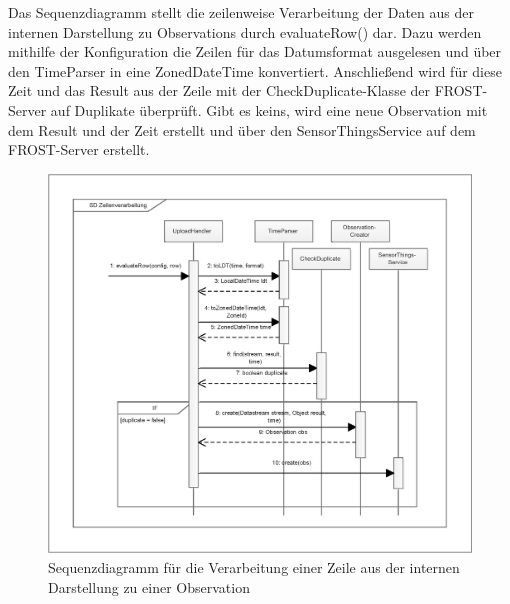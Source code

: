 Das Sequenzdiagramm stellt die zeilenweise Verarbeitung der Daten aus der internen Darstellung zu Observations durch evaluateRow() dar.
Dazu werden mithilfe der Konfiguration die Zeilen für das Datumsformat ausgelesen und über den TimeParser in eine ZonedDateTime konvertiert.
Anschließend wird für diese Zeit und das Result aus der Zeile mit der CheckDuplicate-Klasse der FROST-Server auf Duplikate überprüft.
Gibt es keins, wird eine neue Observation mit dem Result und der Zeit erstellt und über den SensorThingsService auf dem FROST-Server erstellt.

\vspace{\fill}
\begin{figure}[htbp]
\centering
\includegraphics[scale=0.6]{uml/SD_row.eps}
\caption{Sequenzdiagramm für die Verarbeitung einer Zeile aus der internen Darstellung zu einer Observation}
\end{figure}
\vspace{\fill}

\clearpage
